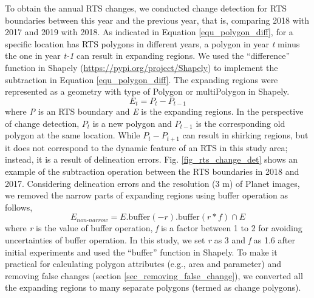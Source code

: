 \documentclass[authoryear,preprint,review,12pt]{elsarticle}
\begin{document}
To obtain the annual RTS changes, we conducted change detection for RTS boundaries between this year and the previous year, that is, comparing 2018 with 2017 and 2019 with 2018. 
 As indicated in Equation \ref{equ_polygon_diff}, for a specific location has RTS polygons in different years, a polygon in year \emph{t} minus the one in year \emph{t-1} can result in expanding regions. 
We used the ``difference'' function in Shapely (\url{https://pypi.org/project/Shapely}) to implement the subtraction in Equation \ref{equ_polygon_diff}. 
The expanding regions were represented as a geometry with type of Polygon or multiPolygon in Shapely.
\begin{equation}
E_{t}= P_{t} - P_{t-1}
\label{equ_polygon_diff}
\end{equation}
where \emph{P} is an RTS boundary and \emph{E} is the expanding regions. 
In the perspective of change detection, $P_{t}$ is a new polygon and $P_{t-1}$ is the corresponding old polygon at the same location. 
While $P_{t} - P_{t+1}$ can result in shirking regions, but it does not correspond to the dynamic feature of an RTS in this study area; instead, it is a result of delineation errors. 
Fig. \ref{fig_rts_change_det} shows an example of the subtraction operation between the RTS boundaries in 2018 and 2017. 
Considering delineation errors and the resolution (3 m) of Planet images, we removed the narrow parts of expanding regions using buffer operation as follows, 
\begin{equation}
E_{non\text{-}narrow}= E.\text{buffer}(-r).\text{buffer}(r*f) \cap E
\label{equ_polygon_buffer}
\end{equation}
where \emph{r} is the value of buffer operation,  \emph{f} is a factor between 1 to 2 for avoiding uncertainties of buffer operation. 
In this study, we set \emph{r} as 3 and \emph{f} as 1.6 after initial experiments and used the ``buffer'' function in Shapely.
To make it practical for calculating polygon attributes (e.g., area and parameter) and removing false changes (section \ref{sec_removing_false_change}), we converted all the expanding regions to many separate polygons (termed as change polygons).



\end{document}
